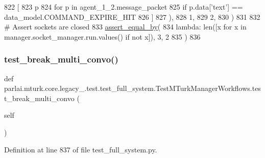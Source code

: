 \begin{DoxyCode}
822                 [
823                     p
824                     \textcolor{keywordflow}{for} p \textcolor{keywordflow}{in} agent\_1\_2.message\_packet
825                     \textcolor{keywordflow}{if} p.data[\textcolor{stringliteral}{'text'}] == data\_model.COMMAND\_EXPIRE\_HIT
826                 ]
827             ),
828             1,
829             2,
830         )
831 
832         \textcolor{comment}{# Assert sockets are closed}
833         \hyperlink{namespaceparlai_1_1mturk_1_1core_1_1test_1_1test__full__system_a0b463246d35658a2e422010f13dcf819}{assert\_equal\_by}(
834             \textcolor{keyword}{lambda}: len([x \textcolor{keywordflow}{for} x \textcolor{keywordflow}{in} manager.socket\_manager.run.values() \textcolor{keywordflow}{if} \textcolor{keywordflow}{not} x]), 3, 2
835         )
836 
\end{DoxyCode}
\mbox{\label{classparlai_1_1mturk_1_1core_1_1legacy__2018_1_1test_1_1test__full__system_1_1TestMTurkManagerWorkflows_a7bb327cdbf5f8266b384e619fbe28cd9}} 
\subsubsection{\texorpdfstring{test\+\_\+break\+\_\+multi\+\_\+convo()}{test\_break\_multi\_convo()}}
{\footnotesize\ttfamily def parlai.\+mturk.\+core.\+legacy\+\_.\+test.\+test\+\_\+full\+\_\+system.\+Test\+M\+Turk\+Manager\+Workflows.\+test\+\_\+break\+\_\+multi\+\_\+convo (\begin{DoxyParamCaption}\item[{}]{self }\end{DoxyParamCaption})}



Definition at line 837 of file test\+\_\+full\+\_\+system.\+py.


